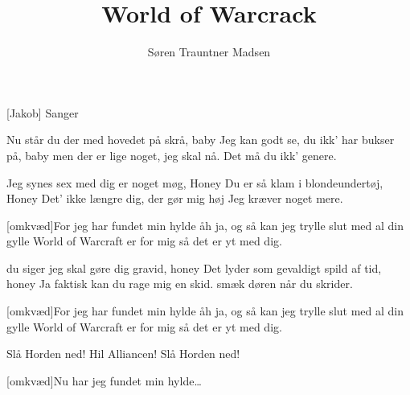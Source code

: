 \documentclass[a4paper,11pt]{article}
\title{World of Warcrack}
\author{Søren Trauntner Madsen}
\begin{document}
\maketitle

\begin{roles}
[Jakob] Sanger 
\end{roles}

\begin{props}
\prop{}
\end{props}

  
\begin{song}

Nu står du der med hovedet på skrå, baby
Jeg kan godt se, du ikk' har bukser på, baby
men der er lige noget, jeg skal nå.
Det må du ikk' genere.

Jeg synes sex med dig er noget møg, Honey
Du er så klam i blondeundertøj, Honey
Det' ikke længre dig, der gør mig høj
Jeg kræver noget mere.

[omkvæd]For jeg har fundet min hylde
åh ja, og så kan jeg trylle
slut med al din gylle
World of Warcraft er for mig
så det er yt med dig.

du siger jeg skal gøre dig gravid, honey
Det lyder som gevaldigt spild af tid, honey
Ja faktisk kan du rage mig en skid.
smæk døren når du skrider.

[omkvæd]For jeg har fundet min hylde
åh ja, og så kan jeg trylle
slut med al din gylle
World of Warcraft er for mig
så det er yt med dig.

Slå Horden ned! Hil Alliancen! Slå Horden ned!

[omkvæd]Nu har jeg fundet min hylde\ldots


\end{song}
\end{document}
